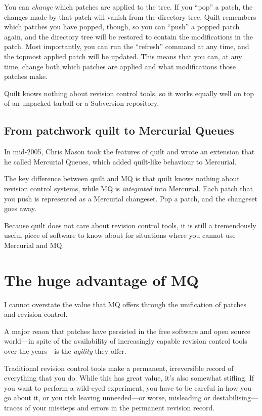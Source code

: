You can \emph{change} which patches are applied to the tree.  If you
``pop'' a patch, the changes made by that patch will vanish from the
directory tree.  Quilt remembers which patches you have popped,
though, so you can ``push'' a popped patch again, and the directory
tree will be restored to contain the modifications in the patch.  Most
importantly, you can run the ``refresh'' command at any time, and the
topmost applied patch will be updated.  This means that you can, at
any time, change both which patches are applied and what
modifications those patches make.

Quilt knows nothing about revision control tools, so it works equally
well on top of an unpacked tarball or a Subversion repository.

\subsection{From patchwork quilt to Mercurial Queues}
\label{sec:mq:quilt-mq}

In mid-2005, Chris Mason took the features of quilt and wrote an
extension that he called Mercurial Queues, which added quilt-like
behaviour to Mercurial.

The key difference between quilt and MQ is that quilt knows nothing
about revision control systems, while MQ is \emph{integrated} into
Mercurial.  Each patch that you push is represented as a Mercurial
changeset.  Pop a patch, and the changeset goes away.

Because quilt does not care about revision control tools, it is still
a tremendously useful piece of software to know about for situations
where you cannot use Mercurial and MQ.

\section{The huge advantage of MQ}

I cannot overstate the value that MQ offers through the unification of
patches and revision control.

A major reaon that patches have persisted in the free software and
open source world---in spite of the availability of increasingly
capable revision control tools over the years---is the \emph{agility}
they offer.  

Traditional revision control tools make a permanent, irreversible
record of everything that you do.  While this has great value, it's
also somewhat stifling.  If you want to perform a wild-eyed
experiment, you have to be careful in how you go about it, or you risk
leaving unneeded---or worse, misleading or destabilising---traces of
your missteps and errors in the permanent revision record.

